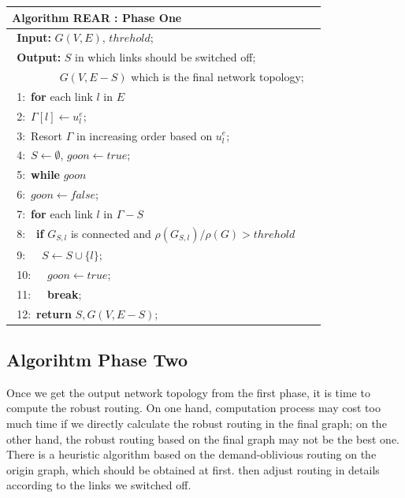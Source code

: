 \documentclass[conference]{IEEEtran}
\begin{document}
\begin{table}[!th]
\begin{tabular}{ll}
\hline
\textbf{Algorithm REAR : Phase One}\\
\hline
$\:\:$\textbf{Input:} $G(V, E)$, $threhold$;\\
$\:\:$\textbf{Output:} $S$ in which links should be switched off;\\
$\quad\qquad\quad$ $G(V, E-S)$ which is the final network topology;\\
$\:\:$1:\ \textbf{for} {each link $l$ in $E$}\\
$\:\:$2:\quad\ $\Gamma[l] \leftarrow u^e_l$;\\
$\:\:$3:\ Resort $\Gamma$ in increasing order based on $u^e_l$;\\
$\:\:$4:\ $S \leftarrow \emptyset$, $goon \leftarrow true$;\\
$\:\:$5:\ \textbf{while} {$goon$}\\
$\:\:$6:\quad\  $goon \leftarrow false$;\\
$\:\:$7:\quad\ \textbf{for} {each link $l$ in $\Gamma - S$}\\
$\:\:$8:\quad\ \quad\ \textbf{if} $G_{S,l}$ is connected and $\rho(G_{S,l})/\rho(G)>threhold$\\
$\:\:$9:\quad\ \quad\ \quad\ $S \leftarrow S \cup \{l\}$;\\
$\:\:$10:\quad\ \quad\ \quad\ $goon \leftarrow true$;\\
$\:\:$11:\quad\ \quad\ \quad\ \textbf{break};\\
$\:\:$12:\ \textbf{return} $S, G(V, E-S)$;\\
\hline
\end{tabular}
\end{table}



\subsection{Algorihtm Phase Two}
Once we get the output network topology from the first phase, it is time to compute
the robust routing. On one hand, computation process may cost too much time if we directly calculate the robust routing in 
the final graph; on the other hand, the robust routing based on the final graph may not be the best one.
There is a heuristic algorithm
based on the demand-oblivious routing on the origin graph, which should be obtained at first.
then adjust routing in details according to the links we switched off.
\end{document}
